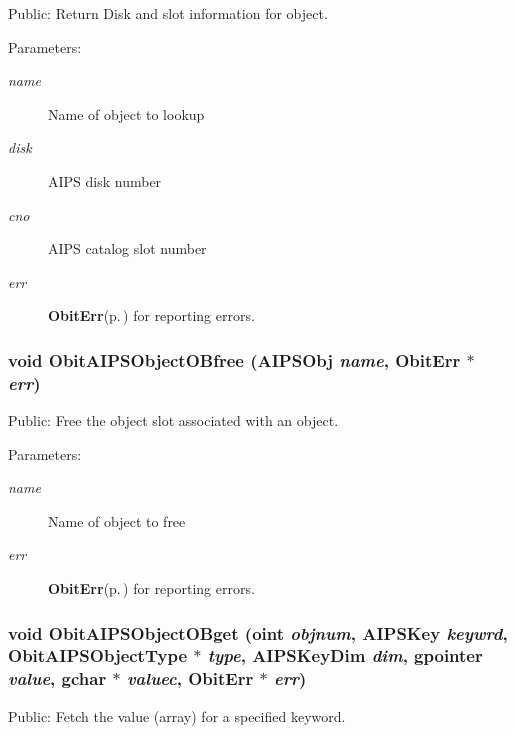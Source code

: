 Public: Return Disk and slot information for object. 

\begin{Desc}
\item[Parameters:]
\begin{description}
\item[{\em name}]Name of object to lookup \item[{\em disk}]AIPS disk number \item[{\em cno}]AIPS catalog slot number \item[{\em err}]{\bf Obit\-Err}{\rm (p.\,\pageref{structObitErr})} for reporting errors. \end{description}
\end{Desc}
\subsubsection{\setlength{\rightskip}{0pt plus 5cm}void Obit\-AIPSObject\-OBfree ({\bf AIPSObj} {\em name}, {\bf Obit\-Err} $\ast$ {\em err})}\label{ObitAIPSObject_8c_a28}


Public: Free the object slot associated with an object. 

\begin{Desc}
\item[Parameters:]
\begin{description}
\item[{\em name}]Name of object to free \item[{\em err}]{\bf Obit\-Err}{\rm (p.\,\pageref{structObitErr})} for reporting errors. \end{description}
\end{Desc}
\subsubsection{\setlength{\rightskip}{0pt plus 5cm}void Obit\-AIPSObject\-OBget ({\bf oint} {\em objnum}, {\bf AIPSKey} {\em keywrd}, Obit\-AIPSObject\-Type $\ast$ {\em type}, {\bf AIPSKey\-Dim} {\em dim}, gpointer {\em value}, gchar $\ast$ {\em valuec}, {\bf Obit\-Err} $\ast$ {\em err})}\label{ObitAIPSObject_8c_a32}


Public: Fetch the value (array) for a specified keyword. 

